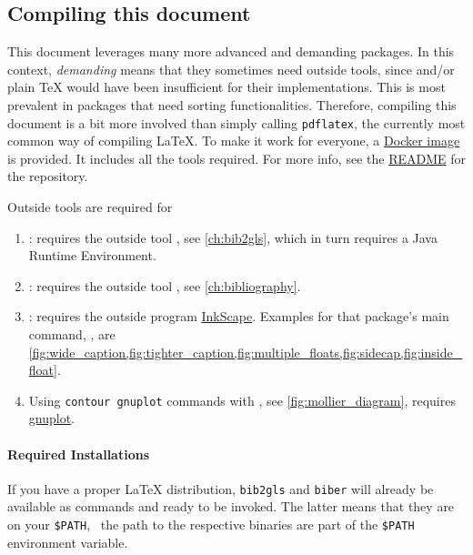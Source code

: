 \subsection*{Compiling this document}

This document leverages many more advanced and demanding packages.
In this context, \emph{demanding} means that they sometimes need outside tools,
since  and/or plain \TeX{} would have been insufficient for their
implementations.
This is most prevalent in packages that need sorting functionalities.
Therefore, compiling this document is a bit more involved than simply calling
\texttt{pdflatex}, the currently most common way of compiling \LaTeX{}.
To make it work for everyone, a
\href{https://hub.docker.com/repository/docker/alexpovel/latex}{Docker image}
is provided.
It includes all the tools required.
For more info, see the
\href{https://collaborating.tuhh.de/cap7863/latex-git-cookbook/-/blob/master/README.md}{README}
for the repository.

Outside tools are required for
\begin{enumerate}
    \item {}: requires the outside tool
        , see \cref{ch:bib2gls}, which in turn requires
        a Java Runtime Environment.
    \item {}: requires the outside tool ,
        see \cref{ch:bibliography}.
    \item {}: requires the outside program
        \href{https://inkscape.org/}{InkScape}.
        Examples for that package's main command, \texttt{}, are
        \cref{fig:wide_caption,fig:tighter_caption,fig:multiple_floats,fig:sidecap,fig:inside_float}.
    \item Using \texttt{contour gnuplot} commands with , see
        \cref{fig:mollier_diagram}, requires
        \href{http://www.gnuplot.info/download.html}{gnuplot}.
\end{enumerate}

\paragraph{Required Installations}
If you have a proper \LaTeX{} distribution, \texttt{bib2gls} and \texttt{biber}
will already be available as commands and ready to be invoked.
The latter means that they are on your \texttt{\$PATH}, \ the path to
the respective binaries are part of the \texttt{\$PATH} environment variable.

